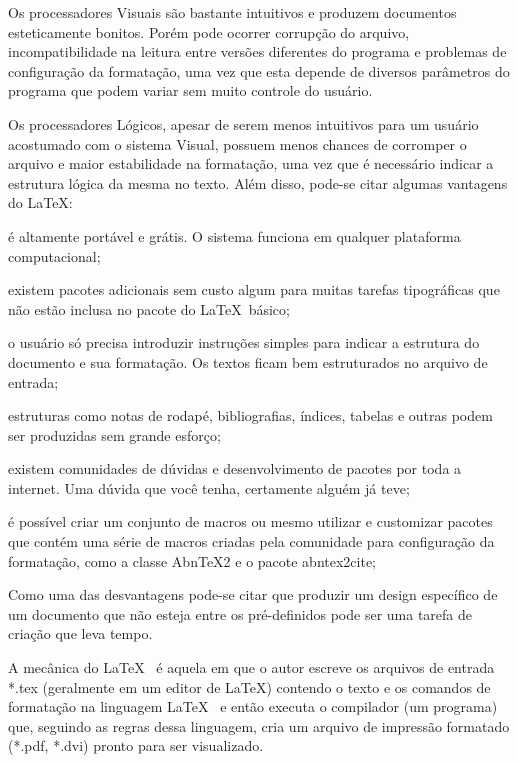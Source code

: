 Os processadores Visuais são bastante intuitivos e produzem documentos esteticamente bonitos. Porém pode ocorrer corrupção do arquivo, incompatibilidade na leitura entre versões diferentes do programa e problemas de configuração da formatação, uma vez que esta depende de diversos parâmetros do programa que podem variar sem muito controle do usuário.

Os processadores Lógicos, apesar de serem menos intuitivos para um usuário acostumado com o sistema Visual, possuem menos chances de corromper o arquivo e maior estabilidade na formatação, uma vez que é necessário indicar a estrutura lógica da mesma no texto. Além disso, pode-se citar algumas vantagens do \LaTeX:

\begin{alineas}
	
	\item é altamente portável e grátis. O sistema funciona em qualquer plataforma computacional;
		
	\item existem pacotes adicionais sem custo algum para muitas tarefas tipográficas que não estão inclusa no pacote do \LaTeX~básico;
	
	\item o usuário só precisa introduzir instruções simples para indicar a estrutura do documento e sua formatação. Os textos ficam bem estruturados no arquivo de entrada;

	\item estruturas como notas de rodapé, bibliografias, índices, tabelas e outras podem ser produzidas sem grande esforço;
	
	\item existem comunidades de dúvidas e desenvolvimento de pacotes por toda a internet. Uma dúvida que você tenha, certamente alguém já teve;
	
	\item é possível criar um conjunto de macros ou mesmo utilizar e customizar pacotes que contém uma série de macros criadas pela comunidade para configuração da formatação, como a classe Abn\TeX2 e o pacote abntex2cite;
	
\end{alineas}

Como uma das desvantagens pode-se citar que produzir um design específico de um documento que não esteja entre os pré-definidos pode ser uma tarefa de criação que leva tempo.

A mecânica do \LaTeX~ é aquela em que o autor escreve os arquivos de entrada *.tex (geralmente em um editor de \LaTeX) contendo o texto e os comandos de formatação na linguagem \LaTeX~ e então executa o compilador (um programa) que, seguindo as regras dessa linguagem, cria um arquivo de impressão formatado (*.pdf, *.dvi) pronto para ser visualizado.

